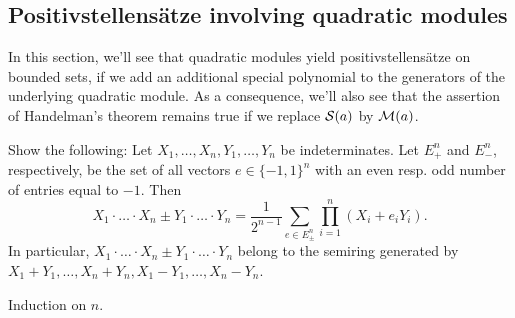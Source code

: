 \subsection{Positivstellensätze involving quadratic modules}

In this section, we'll see that quadratic modules yield positivstellens\"atze on bounded sets, if we add an additional special polynomial to the generators of the underlying quadratic module. As a consequence, we'll also see that the assertion of Handelman's theorem remains true if we replace $\mathcal{S}(a)$ by $\mathcal{M}(a)$. 

\begin{exercise}
	\label{prop:prod:pm:product}
	Show the following: Let $X_1,\ldots,X_n,Y_1,\ldots,Y_n$ be indeterminates. Let $E_+^n$ and $E_-^n$, respectively, be the set of all vectors $e \in \{-1,1\}^n$ with an even resp. odd number of entries equal to $-1$. Then 
	\[
		X_1 \cdot \ldots \cdot X_n \pm Y_1 \cdot \ldots \cdot Y_n = \frac{1}{2^{n-1}} \sum_{e \in E_\pm^n} \prod_{i=1}^n (X_i + e_i Y_i).
	\]
	In particular, $X_1 \cdot \ldots \cdot X_n \pm Y_1 \cdot \ldots \cdot Y_n$ belong to the semiring generated by $X_1+Y_1,\ldots,X_n+Y_n,X_1 - Y_1,\ldots,X_n-Y_n$. 
\end{exercise}
\begin{solution}
	Induction on $n$. 
\end{solution}

